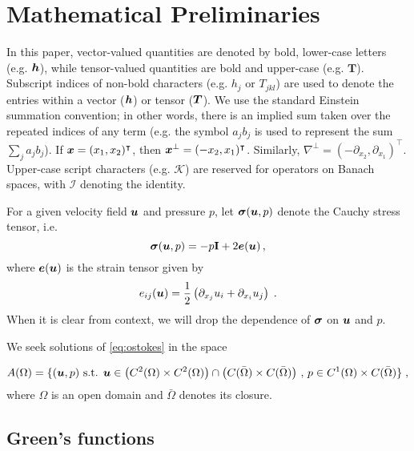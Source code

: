 \section{Mathematical Preliminaries}

In this paper, vector-valued
quantities are denoted by bold, lower-case letters
(e.g. ${\boldsymbol h}$), while tensor-valued quantities are bold
and upper-case (e.g. $\mathbf{T}$). 
Subscript indices of non-bold characters (e.g. $h_j$ or $T_{jkl}$)
are used to denote the entries within a vector (${\boldsymbol h}$) or tensor (${\boldsymbol T}$).
We use the standard Einstein summation convention; in other words, 
there is an implied sum taken over the repeated indices of 
any term (e.g. the symbol $a_{j} b_{j}$ is used to represent the sum
$\sum_{j} a_{j} b_{j}$).
If ${\boldsymbol x} = (x_1,x_2)^\intercal$, then ${\boldsymbol x}^\bot = (-x_2,x_1)^\intercal$.
Similarly, $\nabla^\bot = (-\partial_{x_2},\partial_{x_1})^\intercal$.
Upper-case script characters (e.g. $\mathcal{K}$) are reserved for
operators on Banach spaces, with $\mathcal{I}$ denoting the
identity.

For a given velocity field ${\boldsymbol u}$ and pressure $p$, let ${\boldsymbol \sigma}({\boldsymbol u},p)$
denote the Cauchy stress tensor, i.e.
\begin{equation}
{\boldsymbol \sigma}({\boldsymbol u},p) = -p {\bf I} + 2 {\boldsymbol e}({\boldsymbol u}) \, ,
\end{equation}
where ${\boldsymbol e}({\boldsymbol u})$ is the strain tensor given by
\begin{equation}
e_{ij}({\boldsymbol u}) = \frac{1}{2} \left( \partial_{x_j} u_i + \partial_{x_i} u_j \right) \; .
\end{equation}
When it is clear from context, we will drop the dependence of
${\boldsymbol \sigma}$ on ${\boldsymbol u}$ and $p$.

We seek solutions of \cref{eq:ostokes} in the space

\begin{equation}
  A(\Omega) = \{ ({\boldsymbol u},p) \textrm{ s.t. } {\boldsymbol u} \in
  \left ( C^2(\Omega)\times C^2(\Omega) \right ) \cap
  \left ( C(\bar{\Omega}) \times C(\bar{\Omega}) \right ) \, , \,
  p \in C^1(\Omega) \times C(\bar{\Omega})\} \; ,
\end{equation}
where $\Omega$ is an open domain and $\bar{\Omega}$ denotes
its closure.



\subsection{Green's functions}

